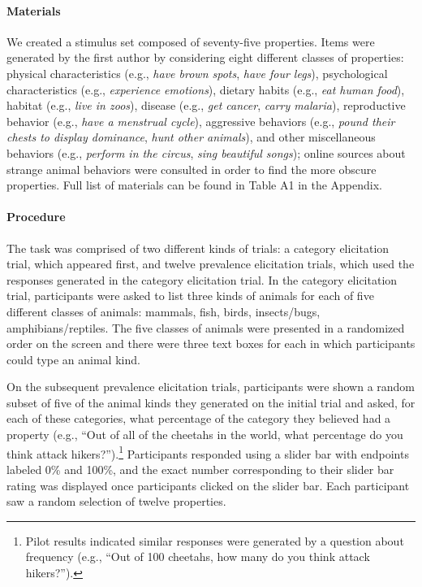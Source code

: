 \documentclass[floatsintext,doc]{apa6}
\let\oldparagraph\paragraph
\renewcommand{\paragraph}[1]{\oldparagraph{#1}\mbox{}}
\let\rmarkdownfootnote\footnote%
\def\footnote{\protect\rmarkdownfootnote}
\begin{document}
\hypertarget{materials}{%
\paragraph{Materials}\label{materials}}
We created a stimulus set composed of seventy-five properties.
Items were generated by the first author by considering eight different classes of properties: physical characteristics (e.g., \emph{have brown spots}, \emph{have four legs}), psychological characteristics (e.g., \emph{experience emotions}), dietary habits (e.g., \emph{eat human food}), habitat (e.g., \emph{live in zoos}), disease (e.g., \emph{get cancer}, \emph{carry malaria}), reproductive behavior (e.g., \emph{have a menstrual cycle}), aggressive behaviors (e.g., \emph{pound their chests to display dominance}, \emph{hunt other animals}), and other miscellaneous behaviors (e.g., \emph{perform in the circus}, \emph{sing beautiful songs}); online sources about strange animal behaviors were consulted in order to find the more obscure properties. Full list of materials can be found in Table A1 in the Appendix.

\hypertarget{procedure-and-materials-1}{%
\paragraph{Procedure}\label{procedure-and-materials-1}}
The task was comprised of two different kinds of trials: a category elicitation trial, which appeared first, and twelve prevalence elicitation trials, which used the responses generated in the category elicitation trial.
In the category elicitation trial, participants were asked to list three kinds of animals for each of five different classes of animals: mammals, fish, birds, insects/bugs, amphibians/reptiles.
The five classes of animals were presented in a randomized order on the screen and there were three text boxes for each in which participants could type an animal kind.

On the subsequent prevalence elicitation trials, participants were shown a random subset of five of the animal kinds they generated on the initial trial and asked, for each of these categories, what percentage of the category they believed had a property (e.g., \enquote{Out of all of the cheetahs in the world, what percentage do you think attack hikers?}).\footnote{Pilot results indicated similar responses were generated by a question about frequency (e.g., \enquote{Out of 100 cheetahs, how many do you think attack hikers?}).} 
Participants responded using a slider bar with endpoints labeled 0\% and 100\%, and the exact number corresponding to their slider bar rating was displayed once participants clicked on the slider bar.
Each participant saw a random selection of twelve properties.
\end{document}
